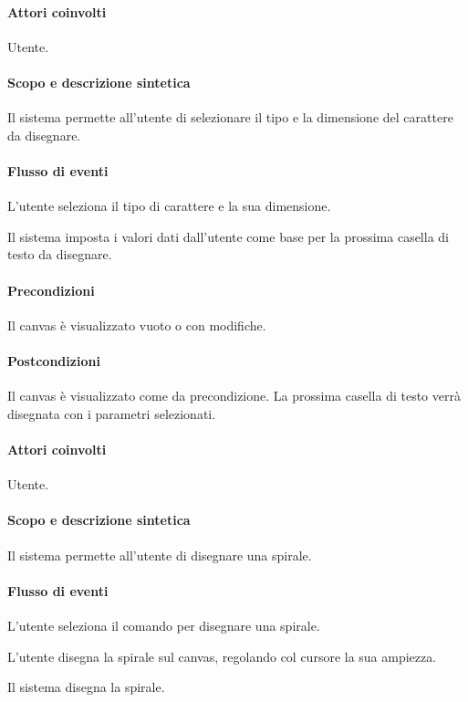 \paragraph{Attori coinvolti} Utente.
\paragraph{Scopo e descrizione sintetica} 
Il sistema permette all'utente di selezionare il tipo e la dimensione del carattere da disegnare.
\paragraph{Flusso di eventi}
\begin{elenconumerato}[\textbf{}]{\subsubsecindent}
\item L'utente seleziona il tipo di carattere e la sua dimensione.
\item Il sistema imposta i valori dati dall'utente come base per la prossima casella di testo da disegnare.
\end{elenconumerato}
\paragraph{Precondizioni} Il canvas \`e visualizzato vuoto o con modifiche.
\paragraph{Postcondizioni} Il canvas \`e visualizzato come da precondizione. La prossima casella di testo verr\` a disegnata con i parametri selezionati.

\paragraph{Attori coinvolti} Utente.
\paragraph{Scopo e descrizione sintetica} 
Il sistema permette all'utente di disegnare una spirale.
\paragraph{Flusso di eventi}
\begin{elenconumerato}[\textbf{}]{\subsubsecindent}
\item L'utente seleziona il comando per disegnare una spirale.
\item L'utente disegna la spirale sul canvas, regolando col cursore la sua ampiezza.
\item Il sistema disegna la spirale.
\end{elenconumerato}
